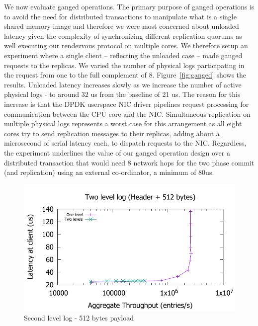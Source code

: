 \documentclass[twocolumn]{article}
\begin{document}
We now evaluate ganged operations. The primary purpose of
ganged operations is to avoid the need for distributed transactions to
manipulate what is a single shared memory image and therefore we were most
concerned about unloaded latency given the complexity of synchronizing different
replication quorums as well executing our rendezvous protocol on multiple
cores. We therefore setup an experiment where a single client -- reflecting the
unloaded case -- made ganged requests to the replicas. We varied the number of
physical logs participating in the request from one to the full complement of 8.
Figure~\ref{fig:ganged} shows the results. Unloaded
latency increases slowly as we increase the number of active physical logs - to
around 32 us from the baseline of 21 us. The reason for this increase is that
the DPDK userspace NIC driver pipelines request processing for communication
between the CPU core and the NIC. Simultaneous replication on multiple physical
logs represents a worst case for this arrangement as all eight cores try to
send replication messages to their replicas, adding about a microsecond of
serial latency each, to dispatch requests to the NIC. Regardless, the experiment
underlines the value of our ganged operation design over a distributed
transaction that would need 8 network hops for the two phase commit (and
replication) using an external co-ordinator, a minimum of 80us.

\begin{figure}
  \includegraphics[scale=0.6]{results2/flashlog_512.pdf}
  \caption{Second level log - 512 bytes payload}
  \label{fig:flashlog_512}
\end{figure}
\end{document}
